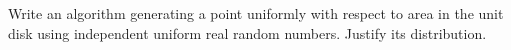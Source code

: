 Write an algorithm generating a point uniformly with respect to area in the unit disk using independent uniform real random numbers. Justify its distribution.
